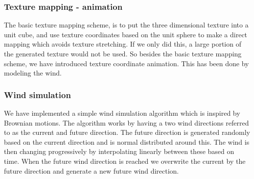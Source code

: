 \subsubsection{Texture mapping - animation}
The basic texture mapping scheme, is to put the three dimensional
texture into a unit cube, and use texture coordinates based on the
unit sphere to make a direct mapping which avoids texture stretching.
%
If we only did this, a large portion of the generated texture would
not be used.
%
So besides the basic texture mapping scheme, we have introduced
texture coordinate animation. This has been done by modeling the wind.

\subsubsection{Wind simulation}
We have implemented a simple wind simulation algorithm which is
inspired by Brownian motions. \citebook{}{}
The algorithm works by having a two wind directions referred to as the
current and future direction. The future direction is generated
randomly based on the current direction and is normal distributed
around this. The wind is then changing progressively by interpolating
linearly between these based on time. When the future wind direction is
reached we overwrite the current by the future direction and generate
a new future wind direction.


